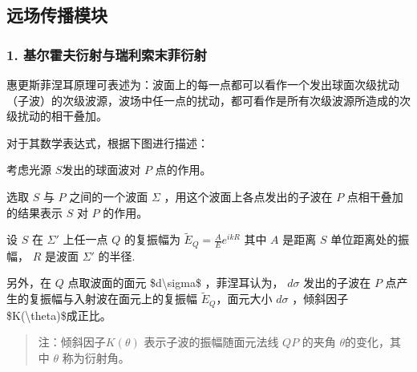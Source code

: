 \documentclass[letterpaper,10pt,english]{sphinxmanual}
\begin{document}
\sphinxAtStartPar
{}





\sphinxstepscope


\subsection{远场传播模块}
\label{\detokenize{_u7b80_u4ecb/_u6838_u5fc3_u8bbe_u8ba1_u4f18_u5316_u7b97_u6cd5/_u8fdc_u573a_u4f20_u64ad_u6a21_u5757/contents:id1}}\label{\detokenize{_u7b80_u4ecb/_u6838_u5fc3_u8bbe_u8ba1_u4f18_u5316_u7b97_u6cd5/_u8fdc_u573a_u4f20_u64ad_u6a21_u5757/contents::doc}}

\subsubsection{1. 基尔霍夫衍射与瑞利\sphinxhyphen{}索末菲衍射}
\label{\detokenize{_u7b80_u4ecb/_u6838_u5fc3_u8bbe_u8ba1_u4f18_u5316_u7b97_u6cd5/_u8fdc_u573a_u4f20_u64ad_u6a21_u5757/contents:id2}}
\sphinxAtStartPar
惠更斯\sphinxhyphen{}菲涅耳原理可表述为：波面上的每一点都可以看作一个发出球面次级扰动（子波）的次级波源，波场中任一点的扰动，都可看作是所有次级波源所造成的次级扰动的相干叠加。

\sphinxAtStartPar
对于其数学表达式，根据下图进行描述：

\sphinxAtStartPar


\sphinxAtStartPar
{}





\sphinxAtStartPar
考虑光源 \(S\)发出的球面波对 \(P\) 点的作用。

\sphinxAtStartPar
选取 \(S\) 与 \(P\) 之间的一个波面 \(\Sigma\) ，用这个波面上各点发出的子波在 \(P\) 点相干叠加的结果表示 \(S\) 对 \(P\) 的作用。

\sphinxAtStartPar
设 \(S\)  在 \(\Sigma'\) 上任一点 \(Q\) 的复振幅为
\(\tilde{E}_Q=\frac{A}{E}e^{ikR}\)
其中 \(A\)  是距离 \(S\)  单位距离处的振幅， \(R\)  是波面 \(\Sigma'\) 的半径.

\sphinxAtStartPar
另外，在 \(Q\) 点取波面的面元 \$d\textbackslash{}sigma\$ ，菲涅耳认为， \(d\sigma\) 发出的子波在 \(P\) 点产生的复振幅与入射波在面元上的复振幅 \(\tilde{E}_Q\)，面元大小 \(d\sigma\) ，倾斜因子\$K(\textbackslash{}theta)\$成正比。
\begin{quote}

\sphinxAtStartPar
注：倾斜因子\(K(\theta)\) 表示子波的振幅随面元法线 \(QP\) 的夹角 \(\theta\)的变化，其中 \(\theta\) 称为衍射角。
\end{quote}
\end{document}
